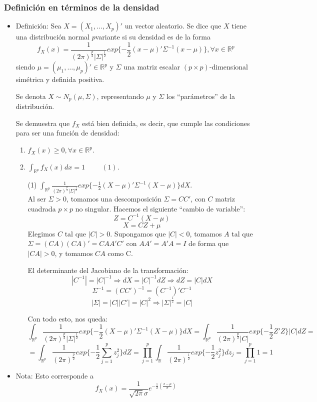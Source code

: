 \documentclass[11pt,a4paper]{article}
\begin{document}
\subsubsection{Definición en términos de la densidad}
\begin{itemize}
\item Definición: Sea $X = (X_{1}, \dots, X_{p})'$ un vector aleatorio. Se dice que $X$ tiene una distribución normal $p$variante si su densidad es de la forma
$$f_{X}(x) = \frac{1}{(2\pi)^{\frac{p}{2}} |\Sigma|^{\frac{1}{2}}} exp\{-\frac{1}{2}(x-\mu)' \Sigma^{-1} (x-\mu)\}, \forall x \in \mathbb{R}^{p}$$
siendo $\mu = (\mu_{1}, \dots, \mu_{p})' \in \mathbb{R}^{p}$ y $\Sigma$ una matriz escalar $(p \times p)$-dimensional simétrica y definida positiva.

Se denota $X \sim N_{p}(\mu, \Sigma)$, representando $\mu$ y $\Sigma$ los ``parámetros'' de la distribución.

Se demuestra que $f_{X}$ está bien definida, es decir, que cumple las condiciones para ser una  función de densidad:
\begin{enumerate}
\item $f_{X}(x) \geq 0, \forall x \in \mathbb{R}^{p}$.
\item $\int_{\mathbb{R}^{p}} f_{X}(x) dx = 1 \hspace{1cm} (1)$.
\item[(1)] $\int_{\mathbb{R}^{p}} \frac{1}{(2\pi)^{\frac{p}{2}}|\Sigma|^{\frac{1}{2}}} exp\{-\frac{1}{2}(X - \mu)' \Sigma^{-1} (X - \mu)\} dX$. \\
Al ser $\Sigma > 0$, tomamos una descomposición $\Sigma = CC'$, con $C$ matriz cuadrada $p \times p$ no singular. Hacemos el siguiente ``cambio de variable'':
$$Z = C^{-1}(X - \mu)$$
$$X = CZ + \mu$$
Elegimos $C$ tal que $|C| > 0$. Supongamos que $|C| < 0$, tomamos $A$ tal que $\Sigma = (CA)(CA)' = CAA'C'$ con $AA' = A'A = I$ de forma que $|CA| > 0$, y tomamos $CA$ como C.

El determinante del Jacobiano de la transformación:
$$|C^{-1}| = |C|^{-1} \Rightarrow dX = |C|^{-1} dZ \Rightarrow dZ = |C| dX$$
$$\Sigma^{-1} = (CC')^{-1} = (C^{-1})'C^{-1}$$
$$|\Sigma| = |C||C'| = |C|^{2} \Rightarrow |\Sigma|^{\frac{1}{2}} = |C|$$

Con todo esto, nos queda:
$$\int_{\mathbb{R}^{p}} \frac{1}{(2\pi)^{\frac{p}{2}}|\Sigma|^{\frac{1}{2}}} exp\{-\frac{1}{2}(X - \mu)' \Sigma^{-1} (X - \mu)\} dX = \int_{\mathbb{R}^{p}} \frac{1}{(2\pi)^{\frac{p}{2}}|C|} exp\{-\frac{1}{2}Z'Z\} |C| dZ =$$
$$= \int_{\mathbb{R}^{p}} \frac{1}{(2\pi)^{\frac{p}{2}}} exp\{-\frac{1}{2} \sum_{j=1}^{p} z_{j}^{2}\} dZ = \prod_{j=1}^{p} \int_{\mathbb{R}} \frac{1}{(2\pi)^{\frac{1}{2}}} exp\{-\frac{1}{2} z_{j}^{2}\} dz_{j} = \prod_{j=1}^{p} 1 = 1$$
\end{enumerate}

\item Nota: Esto corresponde a
$$f_{X}(x) = \frac{1}{\sqrt{2\pi}\sigma}e^{-\frac{1}{2}(\frac{x-\mu}{\sigma})}$$
\end{itemize}
\end{document}
